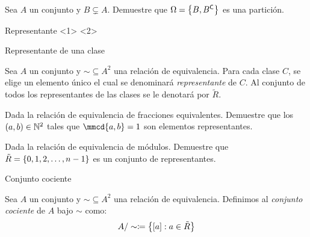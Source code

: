 \begin{frame}
	\begin{exercise}
		Sea $ A $ un conjunto y $ B\subsetneq A $. Demuestre que $ \Omega =\set{B,\mcomp[1]{B}} $ es una partición.
	\end{exercise}
\end{frame}
\begin{frame}
	
\end{frame}
\begin{frame}{Representante}
\end{frame}
\begin{frame}{Representante de una clase}
	\begin{mdefinition}[Representante]
		Sea $ A $ un conjunto y $ \sim\subseteq A^{2} $ una relación de equivalencia. Para cada clase $ C $, se elige un elemento único el cual se denominará \emph{representante} de $ C $. Al conjunto de todos los representantes de las clases se le denotará por $ \tilde{R} $.
	\end{mdefinition}
\end{frame}
\begin{frame}
	\begin{exercise}
		Dada la relación de equivalencia de fracciones equivalentes. Demuestre que los $ (a, b)\in\nmath[2] $ tales que $ \mmcd{a, b} = 1 $ son elementos representantes.
	\end{exercise}
\end{frame}
\begin{frame}
	
\end{frame}
\begin{frame}
	\begin{exercise}
		Dada la relación de equivalencia de módulos. Demuestre que $ \tilde{R} =\set{0, 1, 2,\dotsc, n - 1} $ es un conjunto de representantes.
	\end{exercise}
\end{frame}
\begin{frame}
	
\end{frame}
\begin{frame}{Conjunto cociente}
	\begin{mdefinition}
		Sea $ A $ un conjunto y $ \sim\subseteq A^{2} $ una relación de equivalencia. Definimos al \emph{conjunto cociente} de $ A $ bajo $ \sim $ como:
		\[ A/\sim\coloneqq\set{\bracket{a}: a\in\tilde{R}} \]
	\end{mdefinition}
\end{frame}